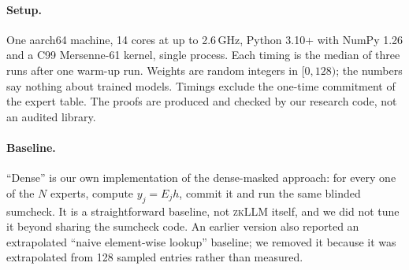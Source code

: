 \documentclass[10pt,twocolumn]{article}
\begin{document}
\paragraph{Setup.} One aarch64 machine, 14 cores at up to 2.6\,GHz, Python 3.10+ with NumPy 1.26 and a C99 Mersenne-61 kernel, single process. Each timing is the median of three runs after one warm-up run. Weights are random integers in $[0,128)$; the numbers say nothing about trained models. Timings exclude the one-time commitment of the expert table. The proofs are produced and checked by our research code, not an audited library.

\paragraph{Baseline.} ``Dense'' is our own implementation of the dense-masked approach: for every one of the $N$ experts, compute $y_j=E_jh$, commit it and run the same blinded sumcheck. It is a straightforward baseline, not \textsc{zkLLM} itself, and we did not tune it beyond sharing the sumcheck code. An earlier version also reported an extrapolated ``naive element-wise lookup'' baseline; we removed it because it was extrapolated from 128 sampled entries rather than measured.
\end{document}
